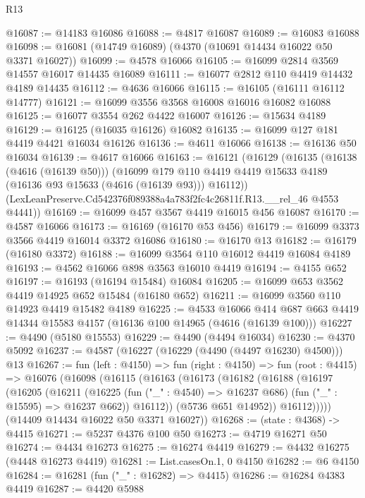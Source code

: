 \begin{lexlean}{R13}
\begin{coremodule}
@16087 := @14183 @16086
@16088 := @4817 @16087
@16089 := @16083 @16088
@16098 := @16081 (@14749 @16089) (@4370 (@10691 @14434 @16022 @50 @3371 @16027))
@16099 := @4578 @16066
@16105 := @16099 @2814 @3569 @14557 @16017 @14435 @16089
@16111 := @16077 @2812 @110 @4419 @14432 @4189 @14435
@16112 := @4636 @16066
@16115 := @16105 (@16111 @16112 @14777)
@16121 := @16099 @3556 @3568 @16008 @16016 @16082 @16088
@16125 := @16077 @3554 @262 @4422 @16007
@16126 := @15634 @4189
@16129 := @16125 (@16035 @16126) @16082
@16135 := @16099 @127 @181 @4419 @4421 @16034 @16126
@16136 := @4611 @16066
@16138 := @16136 @50 @16034
@16139 := @4617 @16066
@16163 := @16121
    (@16129
      (@16135
        (@16138 (@4616 (@16139 @50)))
        (@16099 @179 @110 @4419 @4419 @15633 @4189 (@16136 @93 @15633 (@4616 (@16139 @93))) @16112))
      (LexLeanPreserve.Cd542376f089388a4a783f2fc4c26811f.R13.__rel_46 @4553 @4441))
@16169 := @16099 @457 @3567 @4419 @16015 @456 @16087
@16170 := @4587 @16066
@16173 := @16169 (@16170 @53 @456)
@16179 := @16099 @3373 @3566 @4419 @16014 @3372 @16086
@16180 := @16170 @13
@16182 := @16179 (@16180 @3372)
@16188 := @16099 @3564 @110 @16012 @4419 @16084 @4189
@16193 := @4562 @16066 @898 @3563 @16010 @4419
@16194 := @4155 @652
@16197 := @16193 (@16194 @15484) @16084
@16205 := @16099 @653 @3562 @4419 @14925 @652 @15484 (@16180 @652)
@16211 := @16099 @3560 @110 @14923 @4419 @15482 @4189
@16225 := @4533
    @16066
    @414
    @687
    @663
    @4419
    @14344
    @15583
    @4157
    (@16136 @100 @14965 (@4616 (@16139 @100)))
@16227 := @4490 (@5180 @15553)
@16229 := @4490 (@4494 @16034)
@16230 := @4370 @5092
@16237 := @4587 (@16227 (@16229 (@4490 (@4497 @16230) @4500))) @13
@16267 := fun (left : @4150) =>
  fun (right : @4150) =>
  fun (root : @4415) =>
  @16076
    (@16098
      (@16115
        (@16163
          (@16173
            (@16182
              (@16188
                (@16197
                  (@16205
                    (@16211
                      (@16225
                        (fun ("_" : @4540) => @16237 @686)
                        (fun ("_" : @15595) => @16237 @662))
                      @16112))
                  (@5736 @651 @14952))
                @16112)))))
      (@14409 @14434 @16022 @50 @3371 @16027))
@16268 := (state : @4368) -> @4415
@16271 := @5237 @4376 @100 @50
@16273 := @4719 @16271 @50
@16274 := @4434 @16273
@16275 := @16274 @4419
@16279 := @4432 @16275 (@4448 @16273 @4419)
@16281 := List.casesOn.{1, 0} @4150
@16282 := @6 @4150
@16284 := @16281 (fun ("_" : @16282) => @4415)
@16286 := @16284 @4383 @4419
@16287 := @4420 @5988

\end{coremodule}
\end{lexlean}

